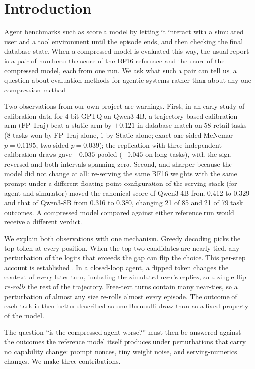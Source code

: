 \section{Introduction}
\label{sec:intro}

Agent benchmarks such as \tautwo{} \citep{barres2025tau2} score a model by letting it interact with a simulated user and a tool environment until the episode ends, and then checking the final database state. When a compressed model is evaluated this way, the usual report is a pair of numbers: the score of the BF16 reference and the score of the compressed model, each from one run. We ask what such a pair can tell us, a question about evaluation methods for agentic systems rather than about any one compression method.

Two observations from our own project are warnings. First, in an early study of calibration data for 4-bit GPTQ on Qwen3-4B, a trajectory-based calibration arm (FP-Traj) beat a static arm by $+0.121$ in database match on 58 retail tasks (8 tasks won by FP-Traj alone, 1 by Static alone; exact one-sided McNemar $p = 0.0195$, two-sided $p = 0.039$); the replication with three independent calibration draws gave $-0.035$ pooled ($-0.045$ on long tasks), with the sign reversed and both intervals spanning zero. Second, and sharper because the model did not change at all: re-serving the same BF16 weights with the same prompt under a different floating-point configuration of the serving stack (for agent and simulator) moved the canonical score of Qwen3-4B from 0.412 to 0.329 and that of Qwen3-8B from 0.316 to 0.380, changing 21 of 85 and 21 of 79 task outcomes. A compressed model compared against either reference run would receive a different verdict.

We explain both observations with one mechanism. Greedy decoding picks the top token at every position. When the top two candidates are nearly tied, any perturbation of the logits that exceeds the gap can flip the choice. This per-step account is established \citep{du2026greedy,chen2026integer,chu2026margingate}. In a closed-loop agent, a flipped token changes the context of every later turn, including the simulated user's replies, so a single flip \emph{re-rolls} the rest of the trajectory. Free-text turns contain many near-ties, so a perturbation of almost any size re-rolls almost every episode. The outcome of each task is then better described as one Bernoulli draw than as a fixed property of the model.

The question ``is the compressed agent worse?'' must then be answered against the outcomes the reference model itself produces under perturbations that carry no capability change: prompt nonces, tiny weight noise, and serving-numerics changes. We make three contributions.

